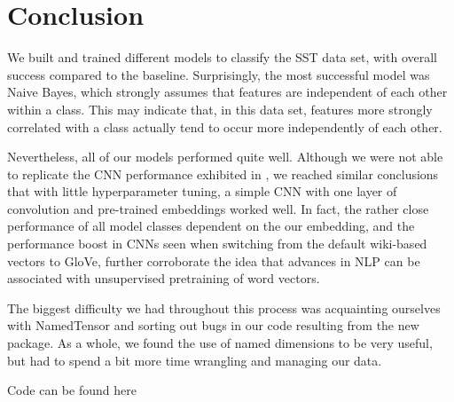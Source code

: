 \documentclass[11pt]{article}
\begin{document}


\section{Conclusion}

We built and trained different models to classify the SST data set, with overall success compared to the baseline. Surprisingly, the most successful model was Naive Bayes, which strongly assumes that features are independent of each other within a class. This may indicate that, in this data set, features more strongly correlated with a class actually tend to occur more independently of each other.

Nevertheless, all of our models performed quite well. Although we were not able to replicate the CNN performance exhibited in \citet{DBLP:journals/corr/Kim14f}, we reached similar conclusions that with little hyperparameter tuning, a simple CNN with one layer of convolution and pre-trained embeddings worked well. In fact, the rather close performance of all model classes dependent on the our embedding, and the performance boost in CNNs seen when switching from the default wiki-based vectors to GloVe, further corroborate the idea that advances in NLP can be associated with unsupervised pretraining of word vectors. 


The biggest difficulty we had throughout this process was acquainting ourselves with NamedTensor and sorting out bugs in our code resulting from the new package.  As a whole, we found the use of named dimensions to be very useful, but had to spend a bit more time wrangling and managing our data.

Code can be found here 



\end{document}
